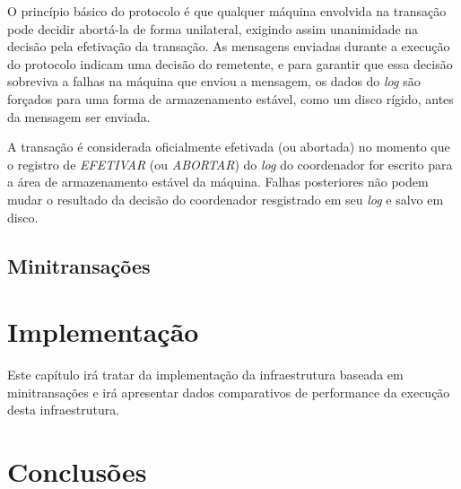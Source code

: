 \documentclass[11pt,twoside,a4paper]{book}
\renewcommand{\chaptermark}[1]{\markboth{\MakeUppercase{#1}}{}}
\begin{document}
O princípio básico do protocolo é que qualquer máquina envolvida na transação pode decidir abortá-la de forma unilateral, exigindo assim unanimidade na decisão pela efetivação da transação. As mensagens enviadas durante a execução do protocolo indicam uma decisão do remetente, e para garantir que essa decisão sobreviva a falhas na máquina que enviou a mensagem, os dados do \emph{log} são forçados para uma forma de armazenamento estável, como um disco rígido, antes da mensagem ser enviada.

A transação é considerada oficialmente efetivada (ou abortada) no momento que o registro de \emph{EFETIVAR} (ou \emph{ABORTAR}) do \emph{log} do coordenador for escrito para a área de armazenamento estável da máquina. Falhas posteriores não podem mudar o resultado da decisão do coordenador resgistrado em seu \emph{log} e salvo em disco.

\section{Minitransações}
\label{sec:minitransacoes}

\chapter{Implementação}
\label{chap:implementacao}

Este capítulo irá tratar da implementação da infraestrutura baseada em minitransações e irá apresentar dados comparativos de performance da execução desta infraestrutura.

\chapter{Conclusões}
\label{chap:conclusoes}

\renewcommand{\chaptermark}[1]{\markboth{\MakeUppercase{\appendixname\ \thechapter}} {\MakeUppercase{#1}} }
\fancyhead[RE,LO]{}
\appendix

% 

\backmatter \singlespacing   %

\end{document}

